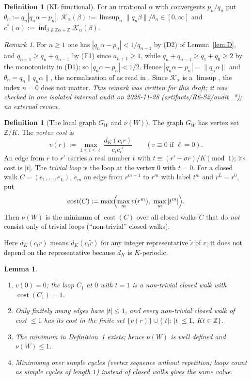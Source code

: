 \documentclass[11pt]{amsart}
\newtheorem{lemma}[theorem]{Lemma}
\theoremstyle{definition}
\newtheorem{definition}[theorem]{Definition}
\theoremstyle{remark}
\newtheorem{remark}[theorem]{Remark}
\newcommand{\Z}{\mathbb{Z}}
\newcommand{\dist}[1]{\lVert #1\rVert}
\newcommand{\KL}{\mathcal{K}}
\newcommand{\cost}{\operatorname{cost}}
\begin{document}
\begin{definition}[KL functional]\label{def:KL}
For an irrational $\alpha$ with convergents $p_n/q_n$ put $\theta_n:=q_n|q_n\alpha-p_n|$,
$\KL_\alpha(\beta):=\limsup_n\dist{q_n\beta}/\theta_n\in[0,\infty]$ and
$c^*(\alpha):=\inf_{\beta\notin\Z\alpha+\Z}\KL_\alpha(\beta)$.
\end{definition}

\begin{remark}\label{rem:theta-conv}
For $n\ge1$ one has $|q_n\alpha-p_n|<1/q_{n+1}$ by (D2) of Lemma~\ref{lem:D}, and $q_{n+1}\ge q_n+q_{n-1}$ by (F1)
since $a_{n+1}\ge1$, while $q_n+q_{n-1}\ge q_1+q_0\ge2$ by the monotonicity in (D1); so $|q_n\alpha-p_n|<1/2$. Hence
$|q_n\alpha-p_n|=\dist{q_n\alpha}$ and $\theta_n=q_n\dist{q_n\alpha}$, the normalisation of \cite{KL} as read in
\cite{D5}. Since $\KL_\alpha$ is a $\limsup$, the index $n=0$ does not matter. \emph{This remark was written for this
draft; it was checked in one isolated internal audit on 2026-11-28 (artifacts/R6-S2/audit\_*); no external review.}
\end{remark}

\begin{definition}[The local graph $G_W$ and $\nu(W)$]\label{def:graph}
The graph $G_W$ has vertex set $\Z/K$. The \emph{vertex cost} is
\[
v(r):=\max_{1\le i\le\ell}\frac{d_K(c_ir)}{c_ic_i'}\qquad(v\equiv0\text{ if }\ell=0).
\]
An edge from $r$ to $r'$ carries a real number $t$ with $t\equiv(r'-\sigma r)/K\pmod 1$; its cost is $|t|$.
The \emph{trivial loop} is the loop at the vertex $0$ with $t=0$. For a closed walk
$C=(e_1,\dots,e_L)$, $e_m$ an edge from $r^{m-1}$ to $r^m$ with label $t^m$ and $r^L=r^0$, put
\[
\cost(C):=\max\Bigl(\max_m v(r^m),\ \max_m|t^m|\Bigr).
\]
Then $\nu(W)$ is the minimum of $\cost(C)$ over all closed walks $C$ that do \emph{not} consist only of
trivial loops (``non-trivial'' closed walks).
\end{definition}
Here $d_K(c_ir)$ means $d_K(c_i\tilde r)$ for any integer representative $\tilde r$ of $r$; it does not depend
on the representative because $d_K$ is $K$-periodic.

\begin{lemma}\label{lem:C}
\begin{enumerate}
\item[(C0)] $v(0)=0$; the loop $C_1$ at $0$ with $t=1$ is a non-trivial closed walk with $\cost(C_1)=1$.
\item[(C1)] Only finitely many edges have $|t|\le1$, and every non-trivial closed walk of cost $\le1$
has its cost in the finite set $\{v(r)\}\cup\{|t|:\ |t|\le1,\ Kt\in\Z\}$.
\item[(C2)] The minimum in Definition~\ref{def:graph} exists; hence $\nu(W)$ is well defined and
$\nu(W)\le1$.
\item[(C3)] Minimising over simple cycles (vertex sequence without repetition; loops count as simple
cycles of length $1$) instead of closed walks gives the same value.
\end{enumerate}
\end{lemma}
\end{document}
